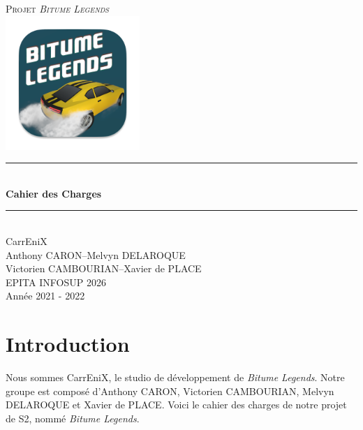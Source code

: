 \documentclass[12pt,a4paper]{article}
\newcommand{\btmlgs}{\textit{Bitume Legends}}
\newcommand{\CEX}{CarrEniX}
\begin{document}
\begin{titlepage}
  \newcommand{\HRule}{\rule{\linewidth}{0.5mm}}
  \center
  \textsc{\LARGE Projet \btmlgs}\\[1cm]
  \includegraphics[scale=0.7]{Medias/logo192.png} \\[1cm]
  \HRule \\[0.4cm]
  { \huge \bfseries Cahier des Charges \\[0.15cm] }
  \HRule \\[1.5cm]
  \CEX \\[0.3cm]
  Anthony CARON\;--\;Melvyn DELAROQUE\\ Victorien CAMBOURIAN\;--\;Xavier de PLACE
   \\ [6cm]
  EPITA INFOSUP 2026\\Année 2021 - 2022
  \end{titlepage}

\tableofcontents
\clearpage

\section{Introduction}
  Nous sommes \CEX, le studio de développement de \btmlgs. Notre groupe est composé d'Anthony CARON, 
  Victorien CAMBOURIAN, Melvyn DELAROQUE et Xavier de PLACE. Voici le cahier des charges de notre projet
  de S2, nommé \btmlgs.\\
  
\end{document}
